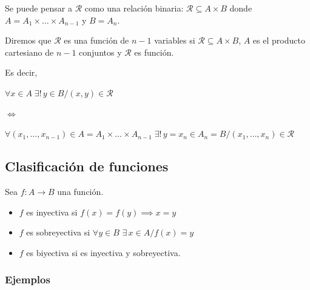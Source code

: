 Se puede pensar a $\mathcal{R}$ como una relación binaria:
$\mathcal{R} \subseteq A \times B$
donde
$A = A_1 \times \dots \times A_{n-1}$
y  $B = A_n$.

Diremos que $\mathcal{R}$ es una función de $n-1$ variables si 
$\mathcal{R} \subseteq A \times B$, $A$ es el producto cartesiano de $n-1$ 
conjuntos y $\mathcal{R}$ es función.

Es decir, 
    \begin{center}
        $\forall x \in A \; \exists ! \, y \in B / (x,y) \in \mathcal{R}$

        $\iff$

        $\forall (x_1, \dotsc, x_{n-1}) \in A = A_1 \times \dots \times A_{n-1}
        \; \exists ! \, y=x_n \in A_n = B / (x_1, \dotsc, x_n) \in \mathcal{R}$
    \end{center}


\subsection{Clasificación de funciones}

Sea $f: A \to B$ una función.

\begin{itemize}
    \item $f$ es inyectiva si $f(x) = f(y) \implies x = y$
    \item $f$ es sobreyectiva si $\forall y \in B$  $\exists \, x \in A / f(x)=y$
    \item $f$ es biyectiva si es inyectiva y sobreyectiva.
\end{itemize}

\subsubsection{Ejemplos}

